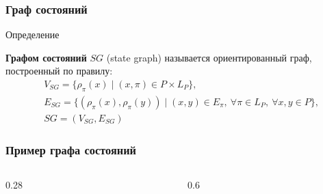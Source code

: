 \begin{frame}
  \frametitle{Граф состояний}
  \begin{block}{Определение}

    \textbf{Графом состояний} $SG$ (state graph) называется
    ориентированный граф, построенный по правилу:
    \begin{equation}
      \begin{aligned}
        &V_{SG} = \{ \rho_{\pi}(x) \mid (x, \pi) \in P \times L_P \}, \\
        &E_{SG} = \{ (\rho_{\pi}(x), \rho_{\pi}(y)) \mid (x, y) \in
        E_\pi,\ \forall \pi \in L_P,\ \forall x, y \in P \}, \\
        &SG = (V_{SG}, E_{SG})
        \nonumber
      \end{aligned}
      \label{eq:sg_def}
    \end{equation}

  \end{block}
\end{frame}

\begin{frame}
  \frametitle{Пример графа состояний}

  \begin{columns}[c, onlytextwidth]
    \begin{column}{0.28\textwidth}
      \centering
      \scalebox{0.6}{}
    \end{column}

    \begin{column}{0.6\textwidth}
      \centering
      \scalebox{0.8}{}
      \label{fig:sg-topo-dep}

    \end{column}
  \end{columns}

\end{frame}

